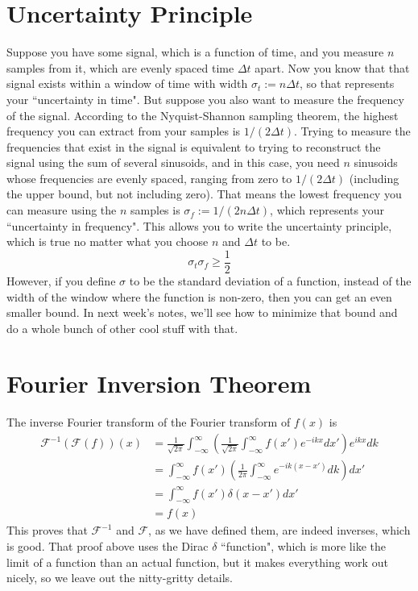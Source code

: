 \documentclass[12pt]{article}
\begin{document}
\section{Uncertainty Principle}
Suppose you have some signal, which is a function of time, and you measure $n$ samples from it, which are evenly spaced time $\Delta t$ apart. Now you know that that signal exists within a window of time with width $\sigma_t := n \Delta t$, so that represents your ``uncertainty in time". But suppose you also want to measure the frequency of the signal. According to the Nyquist-Shannon sampling theorem, the highest frequency you can extract from your samples is $1/(2 \Delta t)$. Trying to measure the frequencies that exist in the signal is equivalent to trying to reconstruct the signal using the sum of several sinusoids, and in this case, you need $n$ sinusoids whose frequencies are evenly spaced, ranging from zero to $1/(2\Delta t)$ (including the upper bound, but not including zero). That means the lowest frequency you can measure using the $n$ samples is $\sigma_f := 1/(2n\Delta t)$, which represents your ``uncertainty in frequency". This allows you to write the uncertainty principle, which is true no matter what you choose $n$ and $\Delta t$ to be.
\[ \sigma_t \sigma_f \geq \frac{1}{2} \]
However, if you define $\sigma$ to be the standard deviation of a function, instead of the width of the window where the function is non-zero, then you can get an even smaller bound. In next week's notes, we'll see how to minimize that bound and do a whole bunch of other cool stuff with that.

\section{Fourier Inversion Theorem}
The inverse Fourier transform of the Fourier transform of $f(x)$ is
\begin{align*}
    \mathcal{F}^{-1}(\mathcal{F}(f))(x) &= \frac{1}{\sqrt{2 \pi}} \int_{-\infty}^\infty \left( \frac{1}{\sqrt{2 \pi}} \int_{-\infty}^\infty f(x') e^{-ikx} dx' \right) e^{ikx} dk \\
    &= \int_{-\infty}^\infty f(x') \left( \frac{1}{2 \pi} \int_{-\infty}^\infty e^{-ik(x - x')} dk \right) dx' \\
    &= \int_{-\infty}^\infty f(x') \delta(x - x') dx' \\
    &= f(x)
\end{align*}
This proves that $\mathcal{F}^{-1}$ and $\mathcal{F}$, as we have defined them, are indeed inverses, which is good. That proof above uses the Dirac $\delta$ ``function", which is more like the limit of a function than an actual function, but it makes everything work out nicely, so we leave out the nitty-gritty details.
\end{document}
